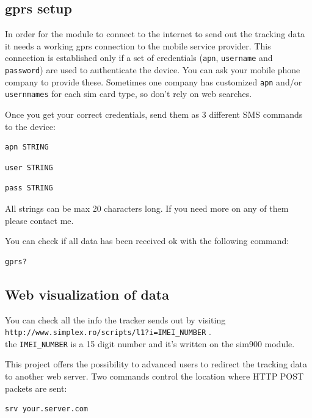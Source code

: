 \documentclass[a4paper,twoside]{refart}
\begin{document}
\subsection{gprs setup}

In order for the module to connect to the internet to send out the tracking data it needs a working gprs connection to the mobile service provider. This connection is established only if a set of credentials (\verb"apn", \verb"username" and \verb"password") are used to authenticate the device. You can ask your mobile phone company to provide these. Sometimes one company has customized \verb"apn" and/or \verb"usernmames" for each sim card type, so don't rely on web searches.

Once you get your correct credentials, send them as 3 different SMS commands to the device:

\begin{lstlisting}
apn STRING
\end{lstlisting}
\begin{lstlisting}
user STRING
\end{lstlisting}
\begin{lstlisting}
pass STRING
\end{lstlisting}

 All strings can be max 20 characters long. If you need more on any of them please contact me.

You can check if all data has been received ok with the following command:

\begin{lstlisting}
gprs?
\end{lstlisting}


\subsection{Web visualization of data}

You can check all the info the tracker sends out by visiting \\ \verb"http://www.simplex.ro/scripts/l1?i=IMEI_NUMBER" .\\
the \verb"IMEI_NUMBER" is a 15 digit number and it's written on the sim900 module.

This project offers the possibility to advanced users to redirect the tracking data to another web server.
Two commands control the location where HTTP POST packets are sent:

\begin{lstlisting}
srv your.server.com
\end{lstlisting}
\end{document}
